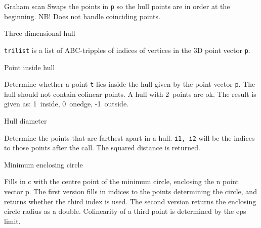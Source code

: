 
\begin{algorithm}{Graham scan}
\desc
Swaps the points in {\tt p} so the hull points are in order at the beginning.  NB! Does not handle coinciding points.
\end{algorithm}


\begin{algorithm}{Three dimensional hull}


\desc
{\tt trilist} is a list of ABC-tripples of indices of vertices in the 3D
point vector {\tt p}.
\end{algorithm}


\begin{algorithm}{Point inside hull}

\desc
Determine whether a point {\tt t} lies inside the hull given by the
point vector {\tt p}. The hull should not contain colinear points. A hull with
2~points are ok. The result is given as: 1~inside, 0~onedge, -1~outside.
\end{algorithm}


\begin{algorithm}{Hull diameter}

\desc
Determine the points that are farthest apart in a hull.
{\tt i1, i2} will be the indices to those points after the call.
The squared distance is returned.
\end{algorithm}


\begin{algorithm}{Minimum enclosing circle}

\desc
Fills in c with the centre point of the minimum circle, enclosing the
n point vector p. The first version fills in indices to the points
determining the circle, and returns whether the third index is used.
The second version returns the enclosing circle radius as a double.
Colinearity of a third point is determined by the eps limit.
\end{algorithm}

